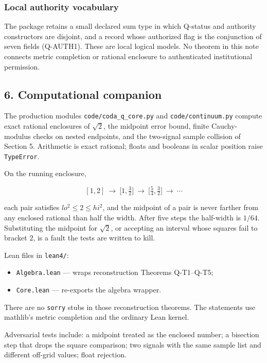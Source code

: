 \documentclass[
  11pt,
]{article}
\providecommand{\tightlist}{%
  \setlength{\itemsep}{0pt}\setlength{\parskip}{0pt}}
\begin{document}
\subsubsection{Local authority vocabulary}\label{local-authority-vocabulary}

The package retains a small declared sum type in which Q-status and authority constructors are disjoint, and a record whose authorized flag is the conjunction of seven fields (Q-AUTH1). These are local logical models. No theorem in this note connects metric completion or rational enclosure to authenticated institutional permission.

\subsection{6. Computational companion}\label{computational-companion}

The production modules \nolinkurl{code/coda_q_core.py} and \texttt{code/continuum.py} compute exact rational enclosures of \(\sqrt{2}\), the midpoint error bound, finite Cauchy-modulus checks on nested endpoints, and the two-signal sample collision of Section 5. Arithmetic is exact rational; floats and booleans in scalar position raise \texttt{TypeError}.

On the running enclosure,

\[
[1,2]
\ \longrightarrow\
\bigl[1,\tfrac{3}{2}\bigr]
\ \longrightarrow\
\bigl[\tfrac{5}{4},\tfrac{3}{2}\bigr]
\ \longrightarrow\ \cdots
\]

each pair satisfies \(lo^2\le 2\le hi^2\), and the midpoint of a pair is never farther from any enclosed rational than half the width. After five steps the half-width is \(1/64\). Substituting the midpoint for \(\sqrt{2}\), or accepting an interval whose squares fail to bracket \(2\), is a fault the tests are written to kill.

Lean files in \texttt{lean4/}:

\begin{itemize}
\tightlist
\item
  \nolinkurl{Algebra.lean} --- wraps reconstruction Theorems Q-T1--Q-T5;
\item
  \texttt{Core.lean} --- re-exports the algebra wrapper.
\end{itemize}

There are no \texttt{sorry} stubs in those reconstruction theorems. The statements use mathlib's metric completion and the ordinary Lean kernel.

Adversarial tests include: a midpoint treated as the enclosed number; a bisection step that drops the square comparison; two signals with the same sample list and different off-grid values; float rejection.
\end{document}
